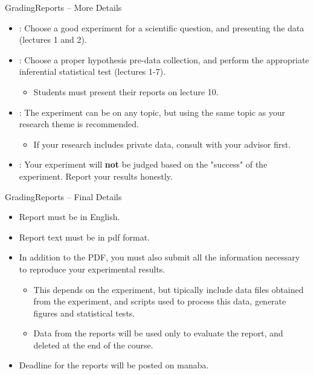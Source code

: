 \documentclass{beamer}
\begin{document}
\begin{CJK}{UTF8}{ipxm}
\begin{frame}{Grading}{Reports -- More Details}
  \begin{itemize}
    \item {}: Choose a good experiment for a scientific question, and presenting the data (lectures 1 and 2). \bigskip
    \item {}: Choose a proper hypothesis pre-data collection, and perform the appropriate inferential statistical test (lectures 1-7).
    \begin{itemize}
      \item Students must present their reports on lecture 10.
    \end{itemize}\bigskip
    \item {}: The experiment can be on any topic, but using the same topic as your research theme is recommended.
    \begin{itemize}
      \item If your research includes private data, consult with your advisor first.
    \end{itemize}\bigskip

    \item {}: Your experiment will {\bf not} be judged based on the "success" of the experiment. Report your results honestly.
  \end{itemize}
\end{frame}

\begin{frame}{Grading}{Reports -- Final Details}
  \begin{itemize}
    \item Report must be in English.\bigskip
    \item Report text must be in pdf format.\bigskip
    \item In addition to the PDF, you must also submit all the information necessary to reproduce your experimental results.
    \begin{itemize}
      \item This depends on the experiment, but tipically include data files obtained from the experiment, and scripts used to process this data, generate figures and statistical tests.
      \item Data from the reports will be used only to evaluate the report, and deleted at the end of the course.
    \end{itemize}\bigskip
    \item Deadline for the reports will be posted on manaba.
  \end{itemize}
\end{frame}


\end{CJK}
\end{document}
